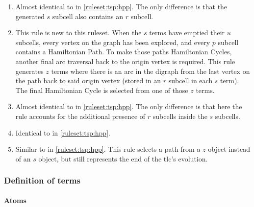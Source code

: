 \begin{enumerate}
    \item Almost identical to  in \cref{ruleset:tsp:hpp}.  The only difference is that the generated \(s\) subcell also contains an \(r\) subcell.
    \item This rule is new to this \gls{ruleset}.  When the \(s\) terms have emptied their \(u\) subcells, every vertex on the graph has been explored, and every \(p\) subcell contains a Hamiltonian Path.  To make those paths Hamiltonian Cycles, another final arc traversal back to the origin vertex is required.  This rule generates \(z\) terms where there is an arc in the digraph from the last vertex on the path back to said origin vertex (stored in an \(r\) subcell in each \(s\) term).  The final Hamiltonian Cycle is selected from one of those \(z\) terms.
    \item Almost identical to  in \cref{ruleset:tsp:hpp}.  The only difference is that here the rule accounts for the additional presence of \(r\) subcells inside the \(s\) subcells.
    \item Identical to  in \cref{ruleset:tsp:hpp}.
    \item Similar to  in \cref{ruleset:tsp:hpp}.  This rule selects a path from a \(z\) object instead of an \(s\) object, but still represents the end of the \gls{tlc}'s evolution.
\end{enumerate}

\subsubsection{Definition of terms}

\paragraph{Atoms}
\begin{description}
\end{description}

